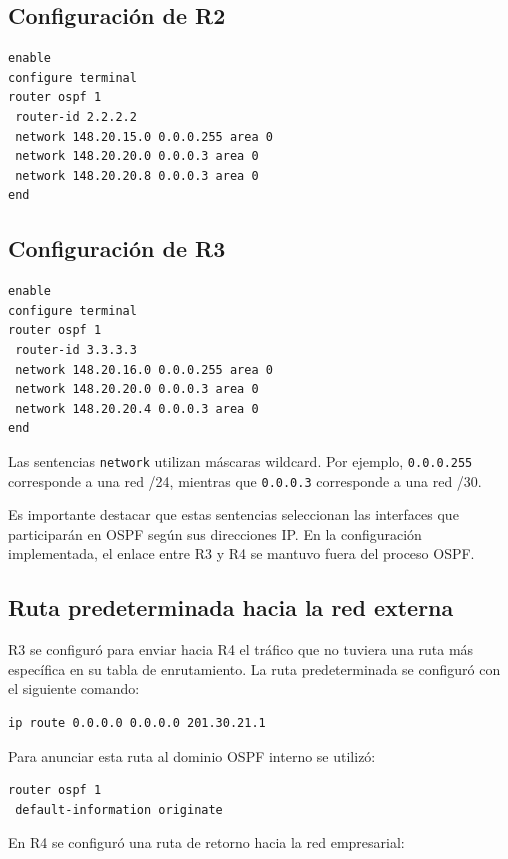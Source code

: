 \documentclass[12pt,a4paper]{article}
\begin{document}
\subsection{Configuración de R2}

\begin{lstlisting}
enable
configure terminal
router ospf 1
 router-id 2.2.2.2
 network 148.20.15.0 0.0.0.255 area 0
 network 148.20.20.0 0.0.0.3 area 0
 network 148.20.20.8 0.0.0.3 area 0
end
\end{lstlisting}

\subsection{Configuración de R3}

\begin{lstlisting}
enable
configure terminal
router ospf 1
 router-id 3.3.3.3
 network 148.20.16.0 0.0.0.255 area 0
 network 148.20.20.0 0.0.0.3 area 0
 network 148.20.20.4 0.0.0.3 area 0
end
\end{lstlisting}

Las sentencias \texttt{network} utilizan máscaras wildcard. Por
ejemplo, \texttt{0.0.0.255} corresponde a una red /24, mientras
que \texttt{0.0.0.3} corresponde a una red /30.

Es importante destacar que estas sentencias seleccionan las
interfaces que participarán en OSPF según sus direcciones IP.
En la configuración implementada, el enlace entre R3 y R4 se
mantuvo fuera del proceso OSPF.

\subsection{Ruta predeterminada hacia la red externa}

R3 se configuró para enviar hacia R4 el tráfico que no tuviera
una ruta más específica en su tabla de enrutamiento. La ruta
predeterminada se configuró con el siguiente comando:

\begin{lstlisting}
ip route 0.0.0.0 0.0.0.0 201.30.21.1
\end{lstlisting}

Para anunciar esta ruta al dominio OSPF interno se utilizó:

\begin{lstlisting}
router ospf 1
 default-information originate
\end{lstlisting}

En R4 se configuró una ruta de retorno hacia la red empresarial:
\end{document}

